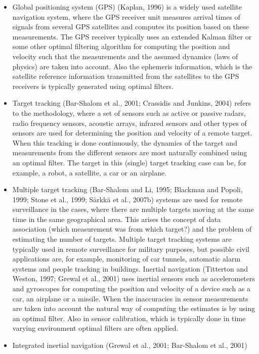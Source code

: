 \documentclass[10pt]{llncs}
\begin{document}
\begin{itemize}
\item  Global positioning system (GPS) 
(Kaplan, 1996) is a widely used satellite
navigation system, where the GPS receiver unit measures arrival times of
signals from several GPS satellites and computes its position based on these
measurements. The GPS receiver typically uses an extended Kalman filter
or some other optimal filtering algorithm for computing the position and
velocity such that the measurements and the assumed dynamics (laws of
physics) are taken into account. Also the ephemeris information, which is
the satellite reference information transmitted from the satellites to the GPS
receivers is typically generated using optimal filters.
\item Target tracking (Bar-Shalom et al., 2001; Crassidis and Junkins, 2004) refers
to the methodology, where a set of sensors such as active or passive radars,
radio frequency sensors, acoustic arrays, infrared sensors and other types
of sensors are used for determining the position and velocity of a remote
target. When this tracking is done continuously, the dynamics of the target
and measurements from the different sensors are most naturally combined
using an optimal filter. The target in this (single) target tracking case can be,
for example, a robot, a satellite, a car or an airplane.
\item Multiple target tracking (Bar-Shalom and Li, 1995; Blackman and Popoli,
1999; Stone et al., 1999; Särkkä et al., 2007b) systems are used for remote
surveillance in the cases, where there are multiple targets moving at the
same time in the same geographical area. This arises the concept of data
association (which measurement was from which target?) and the problem
of estimating the number of targets. Multiple target tracking systems are
typically used in remote surveillance for military purposes, but possible civil
applications are, for example, monitoring of car tunnels, automatic alarm
systems and people tracking in buildings.
Inertial navigation (Titterton and Weston, 1997; Grewal et al., 2001) uses
inertial sensors such as accelerometers and gyroscopes for computing the
position and velocity of a device such as a car, an airplane or a missile.
When the inaccuracies in sensor measurements are taken into account the
natural way of computing the estimates is by using an optimal filter. Also
in sensor calibration, which is typically done in time varying environment
optimal filters are often applied.
\item Integrated inertial navigation (Grewal et al., 2001; Bar-Shalom et al., 2001)

\end{itemize}
\end{document}
